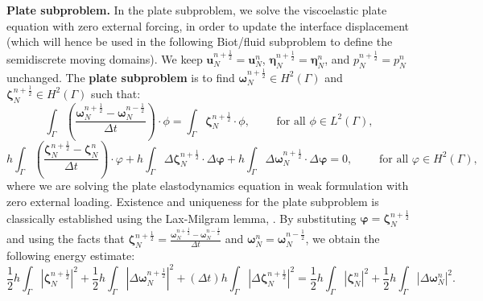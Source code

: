 \documentclass[11pt]{article}
\newcommand{\bd}{\boldsymbol}
\theoremstyle{definition}
\begin{document}
\noindent \textbf{Plate subproblem.} In the plate subproblem, we solve the viscoelastic plate equation with zero external forcing, in order to update the interface displacement (which will hence be used in the following Biot/fluid subproblem to define the semidiscrete moving domains). We keep $\bd{u}^{n + \frac{1}{2}}_{N} = \bd{u}^{n}_{N}$, $\bd{\eta}^{n + \frac{1}{2}}_{N} = \bd{\eta}^{n}_{N}$, and $p^{n + \frac{1}{2}}_{N} = p^{n}_{N}$ unchanged. The \textbf{plate subproblem} is to find $\bd{\omega}^{n + \frac{1}{2}}_{N} \in H^{2}(\Gamma)$ and $\bd{\zeta}^{n + \frac{1}{2}}_{N} \in H^{2}(\Gamma)$ such that: 
\begin{equation}\label{plateweak1}
\int_{\Gamma} \left(\frac{\bd{\omega}^{n + \frac{1}{2}}_{N} - \bd{\omega}^{n - \frac{1}{2}}_{N}}{\Delta t}\right) \cdot \phi = \int_{\Gamma} \bd{\zeta}^{n + \frac{1}{2}}_{N} \cdot \phi, \qquad \text{ for all } \phi \in L^{2}(\Gamma),
\end{equation}
\begin{equation}\label{plateweak2}
h \int_{\Gamma} \left(\frac{\bd{\zeta}^{n + \frac{1}{2}}_{N} - \bd{\zeta}^{n}_{N}}{\Delta t}\right) \cdot \varphi + h \int_{\Gamma} \Delta \bd{\zeta}^{n + \frac{1}{2}}_{N} \cdot \Delta \bd{\varphi} + h \int_{\Gamma} \Delta \bd{\omega}^{n + \frac{1}{2}}_{N} \cdot \Delta \bd{\varphi} = 0, \qquad \text{ for all } \varphi \in H^{2}(\Gamma),
\end{equation}
where we are solving the plate elastodynamics equation in weak formulation with zero external loading. Existence and uniqueness for the plate subproblem is classically established using the Lax-Milgram lemma, \cite{Evans}. By substituting $\bd{\varphi} = \bd{\zeta}^{n + \frac{1}{2}}_{N}$ and using the facts that $\displaystyle \bd{\zeta}^{n + \frac{1}{2}}_{N} = \frac{\bd{\omega}^{n + \frac{1}{2}}_{N} - \bd{\omega}^{n - \frac{1}{2}}_{N}}{\Delta t}$ and $\bd{\omega}^{n}_{N} = \bd{\omega}^{n - \frac{1}{2}}_{N}$, we obtain the following energy estimate:
\begin{equation}\label{energyplate}
\frac{1}{2} h \int_{\Gamma} |\bd{\zeta}^{n + \frac{1}{2}}_{N}|^{2} + \frac{1}{2} h \int_{\Gamma} |\Delta \bd{\omega}^{n + \frac{1}{2}}_{N}|^{2} + (\Delta t) h \int_{\Gamma} |\Delta \bd{\zeta}^{n + \frac{1}{2}}_{N}|^{2} = \frac{1}{2} h \int_{\Gamma} |\bd{\zeta}^{n}_{N}|^{2} + \frac{1}{2} h \int_{\Gamma} |\Delta \bd{\omega}^{n}_{N}|^{2}.
\end{equation}

\medskip
\end{document}
